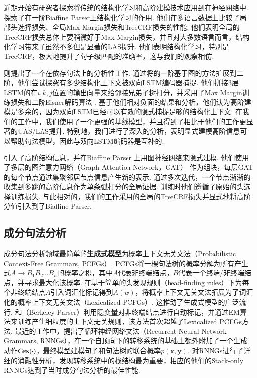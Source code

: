 近期开始有研究者探索将传统的结构化学习和高阶建模技术应用到在神经网络中.
\citet{zhang-etal-2019-empirical}探索了在一阶Biaffine Parser上结构化学习的作用.
他们在多语言数据上比较了局部头选择损失、全局Max Margin损失和TreeCRF损失的性能.
他们表明全局的TreeCRF损失总体上要稍微好于Max Margin损失，并且对大多数语言而言，结构化学习带来了虽然不多但是显著的LAS提升.
他们表明结构化学习，特别是TreeCRF，极大地提升了句子级匹配的准确率，这与我们的观察相仿.

\citet{falenska-kuhn-2019-non}则提出了一个在依存句法上的分析性工作.
通过将\citet{kiperwasser-goldberg-2016-simple}的一阶基于图的方法扩展到二阶，他们尝试探究有多少结构化上下文被双向LSTM编码器捕捉.
他们拼接3层LSTM的在$i,k,j$位置的输出向量来给邻接兄弟子树打分，并采用了Max Margin训练损失和二阶Eisner解码算法 \citep{mcdonald-pereira-2006-online}.
基于他们相对负面的结果和分析，他们认为高阶建模是多余的，因为双向LSTM已经可以有效的隐式捕捉足够的结构化上下文.
在我们的工作中，我们使用了一个更强的基线模型，并且得到了相比于他们的工作更显著的UAS/LAS提升.
特别地，我们进行了深入的分析，表明显式建模高阶信息可以帮助句法模型，因此与双向LSTM编码器是互补的.

\citet{ji-etal-2019-graph}引入了高阶结构信息，并在Biaffine Parser \citep{dozat-etal-2017-biaffine}上用图神经网络来隐式建模.
他们使用了多层的图注意力网络（Graph Attention Network，GAT） \citep{velickovic-etal-2018-graph}作为组块，每层GAT的每个节点通过集聚邻居节点信息产生新的表示.
通过多次迭代，一个节点渐渐的收集到多跳的高阶信息作为单条弧打分的全局证据.
训练时他们遵循了原始的头选择训练损失.
与此相对的，我们的工作采用的全局的TreeCRF损失并显式地将高阶分值引入到了Biaffine Parser.

\subsection{成分句法分析}

成分句法分析领域最简单的\textbf{生成式模型}为概率上下文无关文法（Probabilistic Context-Free Grammars, PCFGs）.
PCFGs将一棵句法树的概率分解为所有产生式$A\rightarrow B_1B_2\dots B_n$的概率之积，其中$A$代表非终端结点，$B$代表一个终端/非终端结点，并寻求最大化该概率.
\citet{collins-1997-three}在基于简单的头发现规则（head-finding rules）下为每个非终端结点$A$引入词汇化标记得到$A(w)$，将概率上下文无关文法拓展为了词汇化的概率上下文无关文法（Lexicalized PCFGs）.
这推动了生成式模型的广泛流行.
\citet{matsuzaki-etal-2005-probabilistic}和\citet{petrov-etal-2006-learning}（Berkeley Parser）利用隐变量对非终端结点进行自动标记，并通过EM算法来训练产生细粒度的上下文无关规则，该方法首次超越了Lexicalized PCFGs方法.
最近的工作中，\citet{dyer-etal-2016-recurrent}提出了循环神经网络文法（Recurrent Neural Network Grammars, RNNGs），在一个自顶向下的转移系统的基础上额外附加了一个生成动作$\textsc{Gen}(\cdot)$，最终模型建模句子和句法树的联合概率$p(\boldsymbol{x},\boldsymbol{y})$.
\citet{kuncoro-etal-2017-recurrent}对RNNGs进行了详细的消融性分析，发现转移系统中的栈结构最为重要，相应的他们的Stack-only RNNGs达到了当时成分句法分析的最佳性能.

